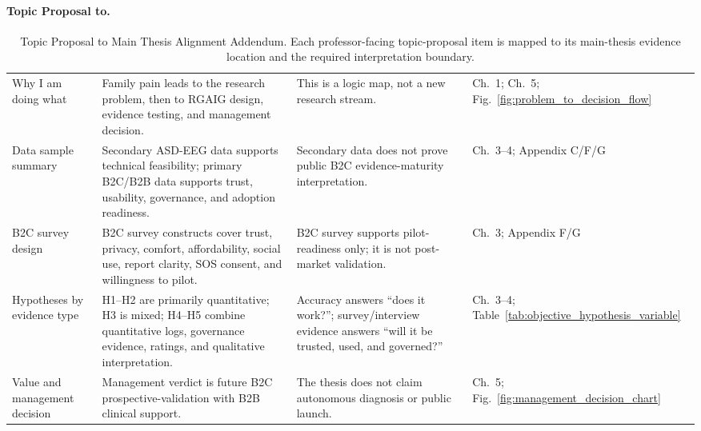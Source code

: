 \paragraph{Topic Proposal to.}




{\tablestripes\tablefontsize
{}
\begin{xltabular}{\textwidth}{@{} >{\raggedright\arraybackslash}p{2.4cm} p{5.3cm} p{4.0cm} >{\raggedright\arraybackslash}p{2.4cm} @{}}
\caption[Topic Proposal to Main Thesis Alignment Addendum]{Topic Proposal to Main Thesis Alignment Addendum. Each professor-facing topic-proposal item is mapped to its main-thesis evidence location and the required interpretation boundary.}\label{tab:topic_proposal_alignment_addendum} \\
\toprule
{} &  &  &  \\
\midrule
\endfirsthead
\endhead
\bottomrule
\endlastfoot
Why I am doing what & Family pain leads to the research problem, then to RGAIG design, evidence testing, and management decision. & This is a logic map, not a new research stream. & Ch.~1; Ch.~5; Fig.~\ref{fig:problem_to_decision_flow} \\
\addlinespace
Data sample summary & Secondary ASD-EEG data supports technical feasibility; primary B2C/B2B data supports trust, usability, governance, and adoption readiness. & Secondary data does not prove public B2C evidence-maturity interpretation. & Ch.~3--4; Appendix C/F/G \\
\addlinespace
B2C survey design & B2C survey constructs cover trust, privacy, comfort, affordability, social use, report clarity, SOS consent, and willingness to pilot. & B2C survey supports pilot-readiness only; it is not post-market validation. & Ch.~3; Appendix F/G \\
\addlinespace
Hypotheses by evidence type & H1--H2 are primarily quantitative; H3 is mixed; H4--H5 combine quantitative logs, governance evidence, ratings, and qualitative interpretation. & Accuracy answers ``does it work?''; survey/interview evidence answers ``will it be trusted, used, and governed?'' & Ch.~3--4; Table~\ref{tab:objective_hypothesis_variable} \\
\addlinespace
Value and management decision & Management verdict is future B2C prospective-validation with B2B clinical support. & The thesis does not claim autonomous diagnosis or public launch. & Ch.~5; Fig.~\ref{fig:management_decision_chart} \\

\end{xltabular}}
